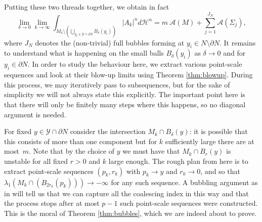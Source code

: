 \documentclass[JEP,XML,SOM,Unicode]{cedram}
\let\mathcal\mathscr
\theoremstyle{definition}
\newcommand{\h}{\mathscr{H}}
\begin{document}
Putting these two threads together, we obtain in fact
\begin{equation}\label{eq.mainlimit}
\lim_{\delta\to 0}\lim_{k\to\infty}\int_{M_k\setminus \left(\bigcup_{y_i \in \mathcal{Y}\cap \partial N} B_{\delta}(y_i)\right)} |A_k|^n d \h^n = m\ \mathcal{A}(M)+ \sum_{j=1}^{J_N} \mathcal{A}(\Sigma_j),
\end{equation}
where $J_N$ denotes the (non-trivial) full bubbles forming at $y_i\in N\setminus\partial N$.
It remains to understand what is happening on the small balls $B_\delta (y_i)$ as $\delta \to 0$ and for $y_i\in \partial N$. In order to study the behaviour here, we extract various point-scale sequences and look at their blow-up limits using Theorem \ref{thm:blowup}. During this process, we may iteratively pass to subsequences, but for the sake of simplicity we will not always state this explicitly. The important point here is that there will only be finitely many steps where this happens, so no diagonal argument is needed. 

For fixed $y\in \mathcal{Y}\cap \partial N$ consider the intersection $M_k\cap B_\delta(y)$: it is possible that this consists of more than one component but for $k$ sufficiently large there are at most~$m$. Note that by the choice of $y$ we must have that $M_k \cap B_{r}(y)$ is unstable for all fixed $r>0$ and $k$ large enough. The rough plan from here is to extract point-scale sequences $(p_k, r_k)$ with $p_k\to y$ and $r_k\to 0$, and so that $\lambda_1(M_k \cap (B_{2r_k}(p_k)))\to -\infty$ for any such sequence. A bubbling argument as in \cite{BS17} will tell us that we can capture all the coalescing index in this way and that the process stops after at most $p-1$ such point-scale sequences were constructed.
This is the moral of Theorem \ref{thm:bubbles}, which we are indeed about to prove.
\end{document}
